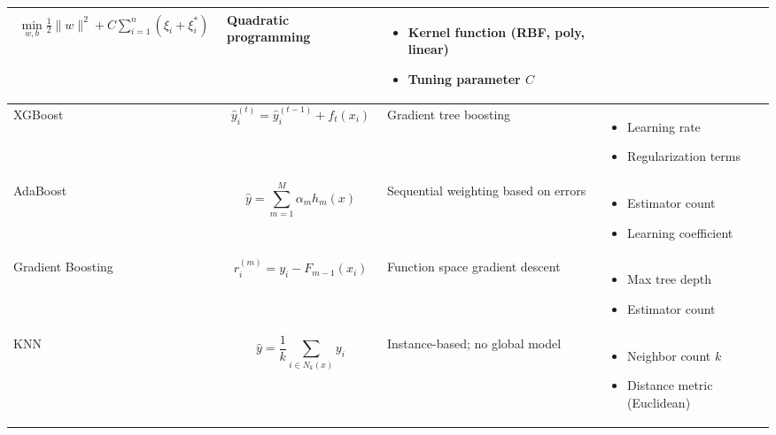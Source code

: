 \documentclass[12pt,a4paper]{article}
\begin{document}
{\begin{longtable}{C{1.5cm} J{4.5cm} C{4cm} C{4cm}}
\begin{equation}
\begin{split}
					\min_{w,b} \frac{1}{2}\|w\|^2 + C \sum_{i=1}^{n} (\xi_i + \xi_i^*)
				\end{split}
			\end{equation}
			& Quadratic programming & 
			\begin{itemize}
				\item Kernel function (RBF, poly, linear)
				\item Tuning parameter $C$
			\end{itemize} \\
			\hline
			XGBoost & 
			\begin{equation}
				\hat{y}_i^{(t)} = \hat{y}_i^{(t-1)} + f_t(x_i)
			\end{equation} 
			& Gradient tree boosting & 
			\begin{itemize}
				\item Learning rate
				\item Regularization terms
			\end{itemize} \\
			\hline
			AdaBoost & 
			\begin{equation}
				\hat{y} = \sum_{m=1}^{M} \alpha_m h_m(x)
			\end{equation} 
			& Sequential weighting based on errors & 
			\begin{itemize}
				\item Estimator count
				\item Learning coefficient
			\end{itemize} \\
			\hline
			Gradient Boosting & 
			\begin{equation}
				r_i^{(m)} = y_i - F_{m-1}(x_i)
			\end{equation} 
			& Function space gradient descent & 
			\begin{itemize}
				\item Max tree depth
				\item Estimator count
			\end{itemize} \\
			\hline
			KNN & 
			\begin{equation}
				\hat{y} = \frac{1}{k} \sum_{i \in N_k(x)} y_i
			\end{equation} 
			& Instance-based; no global model & 
			\begin{itemize}
				\item Neighbor count $k$
				\item Distance metric (Euclidean)
			\end{itemize} \\

\end{longtable}}
\end{document}
